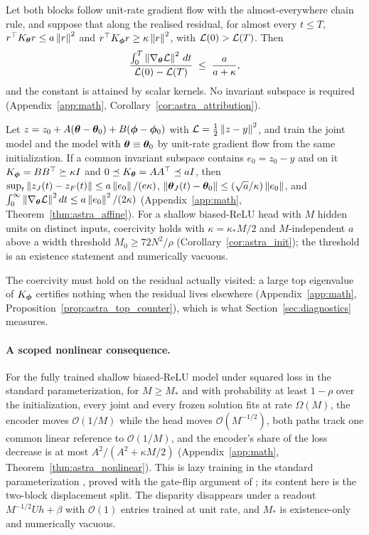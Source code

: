 \begin{corollary}
\label{cor:attribution}
Let both blocks follow unit-rate gradient flow with the almost-everywhere
chain rule, and suppose that along the realised residual, for almost every
$t\le T$, $r^\top K_{\boldsymbol{\theta}} r\le a\left\lVert r\right\rVert^2$ and
$r^\top K_{\boldsymbol{\phi}} r\ge\kappa\left\lVert r\right\rVert^2$, with $\mathcal{L}(0)>\mathcal{L}(T)$. Then
\[
  \frac{\int_0^T\left\lVert\nabla_{\boldsymbol{\theta}}\mathcal{L}\right\rVert^2\,dt}{\mathcal{L}(0)-\mathcal{L}(T)}
  \;\le\;\frac{a}{a+\kappa},
\]
and the constant is attained by scalar kernels. No invariant subspace is
required (Appendix~\ref{app:math}, Corollary~\ref{cor:astra_attribution}).
\end{corollary}

\begin{theorem}
\label{thm:bridge}
Let $z=z_0+A({\boldsymbol{\theta}}-{\boldsymbol{\theta}}_0)+B({\boldsymbol{\phi}}-{\boldsymbol{\phi}}_0)$ with
$\mathcal{L}=\tfrac12\left\lVert z-y\right\rVert^2$, and train the joint model and the model with
${\boldsymbol{\theta}}\equiv{\boldsymbol{\theta}}_0$ by unit-rate gradient flow from the same
initialization. If a common invariant subspace contains $e_0=z_0-y$ and on
it $K_{\boldsymbol{\phi}}=BB^\top\succeq\kappa I$ and $0\preceq K_{\boldsymbol{\theta}}=AA^\top\preceq aI$,
then $\sup_t\left\lVert z_J(t)-z_F(t)\right\rVert\le a\left\lVert e_0\right\rVert/(e\kappa)$,
$\left\lVert{\boldsymbol{\theta}}_J(t)-{\boldsymbol{\theta}}_0\right\rVert\le(\sqrt a/\kappa)\left\lVert e_0\right\rVert$, and
$\int_0^\infty\left\lVert\nabla_{\boldsymbol{\theta}}\mathcal{L}\right\rVert^2dt\le a\left\lVert e_0\right\rVert^2/(2\kappa)$
(Appendix~\ref{app:math}, Theorem~\ref{thm:astra_affine}). For a shallow
biased-ReLU head with $M$ hidden units on distinct inputs, coercivity holds
with $\kappa=\kappa_*M/2$ and $M$-independent $a$ above a width threshold
$M_0\ge72N^2/\rho$ (Corollary~\ref{cor:astra_init}); the threshold is an
existence statement and numerically vacuous.
\end{theorem}

The coercivity must hold on the residual actually visited: a large top
eigenvalue of $K_{\boldsymbol{\phi}}$ certifies nothing when the residual lives elsewhere
(Appendix~\ref{app:math}, Proposition~\ref{prop:astra_top_counter}), which
is what Section~\ref{sec:diagnostics} measures.

\label{par:nonlinear}
\paragraph{A scoped nonlinear consequence.}
For the fully trained shallow biased-ReLU model under squared loss in the
standard parameterization, for $M\ge M_*$ and with probability at least
$1-\rho$ over the initialization, every joint and every frozen solution fits
at rate $\Omega(M)$, the encoder moves $\mathcal{O}(1/M)$ while the head
moves $\mathcal{O}(M^{-1/2})$, both paths track one common linear reference
to $\mathcal{O}(1/M)$, and the encoder's share of the loss decrease is at
most $A^2/(A^2+\kappa M/2)$ (Appendix~\ref{app:math},
Theorem~\ref{thm:astra_nonlinear}). This is lazy training in the standard
parameterization \citep{chizat2019lazy,astra_sohldickstein2020}, proved with
the gate-flip argument of \citet{astra_du2019}; its content here is the
two-block displacement split. The disparity disappears under a readout
$M^{-1/2}Uh+\beta$ with $\mathcal{O}(1)$ entries trained at unit rate, and
$M_*$ is existence-only and numerically vacuous.

